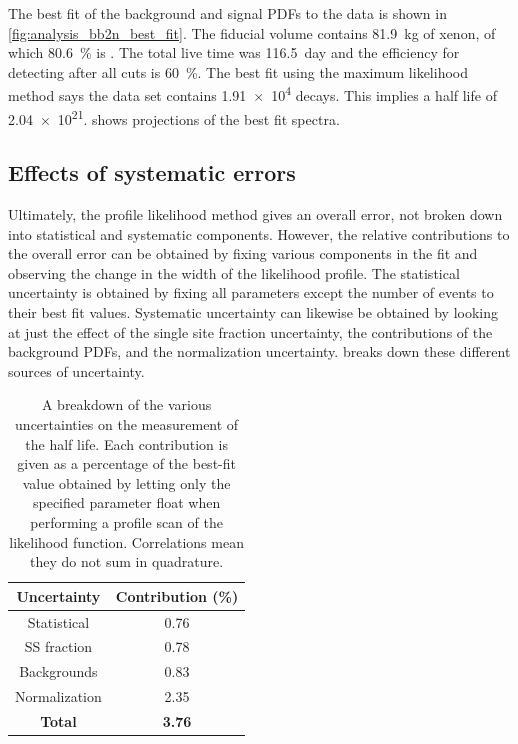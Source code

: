 \documentclass[herrin-thesis.tex]{subfiles}
\begin{document}
The best fit of the background and signal PDFs to the data is shown in \cref{fig:analysis_bb2n_best_fit}. The fiducial volume contains \SI{81.9}{\kg} of xenon, of which \SI{80.6}{\percent} is . The total live time was \SI{116.5}{day} and the efficiency for detecting \twonu{} after all cuts is \SI{60}{\percent}. The best fit using the maximum likelihood method says the data set contains \num{1.91e4} \twonu{} decays. This implies a half life of \SI{2.04e21}{\year}.  shows projections of the best fit spectra.

\subsection{Effects of systematic errors}
Ultimately, the profile likelihood method gives an overall error, not broken down into statistical and systematic components. However, the relative contributions to the overall error can be obtained by fixing various components in the fit and observing the change in the width of the likelihood profile. The statistical uncertainty is obtained by fixing all parameters except the number of \twonu{} events to their best fit values. Systematic uncertainty can likewise be obtained by looking at just the effect of the single site fraction uncertainty, the contributions of the background PDFs, and the normalization uncertainty.  breaks down these different sources of uncertainty.

\begin{table}[htp]
\centering
\caption[Effect of uncertainties on the half life measurement]{A breakdown of the various uncertainties on the measurement of the \twonu{} half life. Each contribution is given as a percentage of the best-fit value obtained by letting only the specified parameter float when performing a profile scan of the likelihood function. Correlations mean they do not sum in quadrature.}
\label{tab:analysis_error_budget}
\begin{tabular}{c c}\toprule
Uncertainty	&	Contribution (\%)	\\\midrule
Statistical		&	0.76				\\
SS fraction	&	0.78				\\
Backgrounds	&	0.83				\\
Normalization	&	2.35				\\\midrule
\textbf{Total}	&	\textbf{3.76}		\\\bottomrule
\end{tabular}
\end{table}
\end{document}
